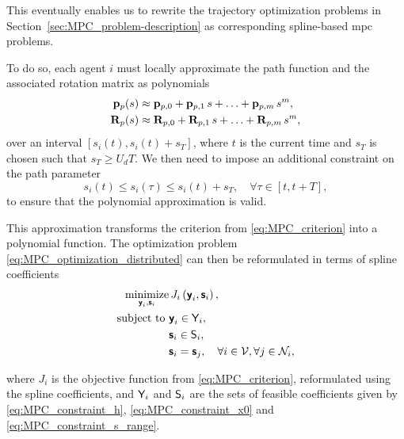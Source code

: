 This eventually enables us to rewrite the trajectory optimization problems in Section~\ref{sec:MPC_problem-description} as corresponding spline-based \gls{mpc} problems. %

To do so, each agent $i$ must locally approximate the path function and the associated rotation matrix as polynomials
\begin{align}
    \mathbf{p}_p(s) &\approx \mathbf{p}_{p, 0} + \mathbf{p}_{p, 1}\,s + \ldots + \mathbf{p}_{p, m}\,s^m, \\
    \mathbf{R}_p(s) &\approx \mathbf{R}_{p,0} + \mathbf{R}_{p,1}\,s + \ldots + \mathbf{R}_{p,m}\,s^m,
\end{align}
over an interval $\left[s_i(t), s_i(t) + s_T\right]$, where $t$ is the current time and $s_T$ is chosen such that $s_T \geq U_d T$.
We then need to impose an additional constraint on the path parameter
\begin{equation}
    s_i(t) \leq s_i(\tau) \leq s_i(t) + s_T, \quad \forall \tau \in \left[t, t + T\right], \label{eq:MPC_constraint_s_range}
\end{equation}
to ensure that the polynomial approximation is valid.

This approximation transforms the criterion from \eqref{eq:MPC_criterion} into a polynomial function.
The optimization problem \eqref{eq:MPC_optimization_distributed} can then be reformulated in terms of spline coefficients 
\begin{subequations}
    \begin{align}
            \operatorname*{minimize}_{\boldsymbol{\mathsf{y}}_i, \boldsymbol{\mathsf{s}}_i} &\, J_i\left(\boldsymbol{\mathsf{y}}_i, \boldsymbol{\mathsf{s}}_i\right), \\
        \text{subject to } & \boldsymbol{\mathsf{y}}_i \in \mathsf{Y}_i, \\
        & \boldsymbol{\mathsf{s}}_i \in \mathsf{S}_i, \\
        & \boldsymbol{\mathsf{s}}_i = \boldsymbol{\mathsf{s}}_j, \quad \forall i \in \mathcal{V}, \forall j \in \mathcal{N}_i, \label{eq:MPC_s_constraint}
    \end{align} \label{eq:MPC_optimization_spline} 
\end{subequations}
\vspace*{-1em}

\noindent where $J_i$ is the objective function from \eqref{eq:MPC_criterion}, reformulated using the spline coefficients, and $\mathsf{Y}_i$ and $\mathsf{S}_i$ are the sets of feasible coefficients given by \eqref{eq:MPC_constraint_h}, \eqref{eq:MPC_constraint_x0} and \eqref{eq:MPC_constraint_s_range}.

